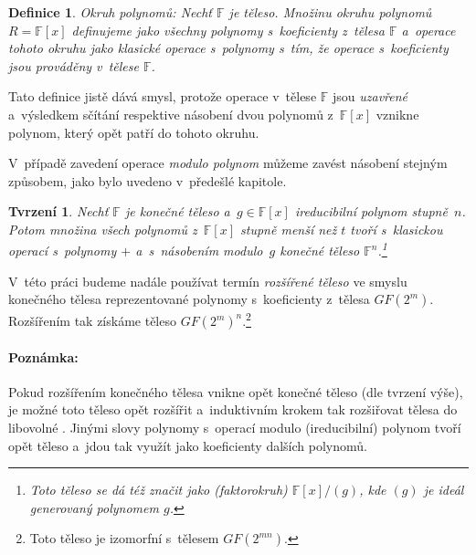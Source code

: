 \documentclass[thesis=M,czech,hidelinks]{FITthesis}[2012/06/26]
\newcommand{\0}{{\textcolor[gray]{0.75}{0}}}
\newtheorem{tvrzeni}{Tvrzení}
\newtheorem{definice}{Definice}
\begin{document}
\begin{definice}{Okruh polynomů:}
    Nechť $\mathbb{F}$ je těleso. Množinu okruhu polynomů $R = \mathbb{F}[x]$
    definujeme jako všechny polynomy s~koeficienty z~tělesa $\mathbb{F}$
    a~operace tohoto okruhu jako klasické operace s~polynomy s~tím, že operace
    s~koeficienty jsou prováděny v~tělese $\mathbb{F}$.
\end{definice}

Tato definice jistě dává smysl, protože operace v~tělese $\mathbb{F}$ jsou
\emph{uzavřené} a~výsledkem sčítání respektive násobení dvou polynomů
z~$\mathbb{F}[x]$ vznikne polynom, který opět patří do tohoto okruhu.

V~případě zavedení operace \emph{modulo polynom} můžeme zavést násobení stejným
způsobem, jako bylo uvedeno v~předešlé kapitole.

\begin{tvrzeni}
    Nechť $\mathbb{F}$ je konečné těleso a~$g \in \mathbb{F}[x]$ \emph{ireducibilní}
    polynom stupně~$n$. Potom množina všech polynomů z~$\mathbb{F}[x]$ stupně
    menší než $t$ tvoří s~klasickou operací s~polynomy $+$ a~s~násobením
    modulo~$g$ \emph{konečné těleso} $\mathbb{F}^n$.\footnote{
        Toto těleso se dá též značit jako (faktorokruh) $\mathbb{F}[x]/(g)$, kde
        $(g)$ je \emph{ideál} generovaný polynomem $g$.
    }
\end{tvrzeni}

V~této práci budeme nadále používat termín \emph{rozšířené těleso} ve smyslu
konečného tělesa reprezentované polynomy s~koeficienty z~tělesa $GF(2^m)$.
Rozšířením tak získáme těleso $GF(2^m)^n$.\footnote{
    Toto těleso je izomorfní s~tělesem  $GF(2^{mn})$.
}


\paragraph{Poznámka:} Pokud rozšířením konečného tělesa vnikne opět konečné
těleso (dle tvrzení výše), je možné toto těleso opět rozšířit a~induktivním
krokem tak rozšiřovat tělesa do libovolné . Jinými slovy polynomy
s~operací modulo (ireducibilní) polynom tvoří opět těleso a~jdou tak využít jako
koeficienty dalších polynomů.





\end{document}
